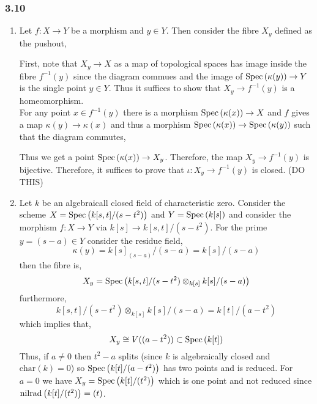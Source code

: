 \documentclass[12pt]{article}
\newcommand{\ch}[1]{\mathrm{char}\left( #1 \right)}
\begin{document}
\subsubsection{3.10}

\begin{enumerate}
\item Let $f : X \to Y$ be a morphism and $y \in Y$. Then consider the fibre $X_y$ defined as the pushout,
\begin{center}
\end{center}
First, note that $X_y \to X$ as a map of topological spaces has image inside the fibre $f^{-1}(y)$ since the diagram commues and the image of $\mathrm{Spec}\left( \kappa(y) \right) \to Y$ is the single point $y \in Y$. Thus it suffices to show that $X_y \to f^{-1}(y)$ is a homeomorphism.
\bigskip\\
For any point $x \in f^{-1}(y)$ there is a morphism $\mathrm{Spec}\left( \kappa(x) \right) \to X$ and $f$ gives a map $\kappa(y) \to \kappa(x)$ and thus a morphism $\mathrm{Spec}\left( \kappa(x) \right) \to \mathrm{Spec}\left( \kappa(y) \right)$ such that the diagram commutes,
\begin{center}
\end{center} 
Thus we get a point $\mathrm{Spec}\left( \kappa(x) \right) \to X_y$. Therefore, the map $X_y \to f^{-1}(y)$ is bijective. Therefore, it suffices to prove that $\iota : X_y \to f^{-1}(y)$ is closed. (DO THIS)
\item Let $k$ be an algebraicall closed field of characteristic zero. Consider the scheme $X = \mathrm{Spec}\left( k[s,t]/(s - t^2) \right)$ and $Y = \mathrm{Spec}\left( k[s] \right)$ and consider the morphism $f : X \to Y$ via $k[s] \to k[s,t]/(s - t^2)$. For the prime $y = (s - a) \in Y$ consider the residue field,
\[ \kappa(y) = k[s]_{(s - a)} / (s - a) = k[s]/(s - a) \]
then the fibre is,
\[ X_y = \mathrm{Spec}\left( k[s,t]/(s - t^2) \otimes_{k[s]} k[s]/(s - a) \right) \]
furthermore,
\[ k[s,t]/(s - t^2) \otimes_{k[s]} k[s]/(s - a) = k[t]/(a - t^2) \]
which implies that,
\[ X_y \cong V((a - t^2)) \subset \mathrm{Spec}\left( k[t] \right) \]
Thus, if $a \neq 0$ then $t^2 - a$ splits (since $k$ is algebraically closed and $\ch{k} = 0$) so $\mathrm{Spec}\left( k[t]/(a - t^2) \right)$ has two points and is reduced. For $a = 0$ we have $X_y = \mathrm{Spec}\left( k[t]/(t^2) \right)$ which is one point and not reduced since $\mathrm{nilrad}\left( k[t]/(t^2) \right) = (t)$.  

\end{enumerate}
\end{document}
